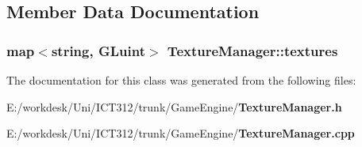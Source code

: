 \subsection{Member Data Documentation}
\subsubsection[{textures}]{\setlength{\rightskip}{0pt plus 5cm}map$<${\bf string}, {\bf G\+Luint}$>$ Texture\+Manager\+::textures\hspace{0.3cm}{\ttfamily [private]}}\label{class_texture_manager_ab74250155ea1d976c6e615e6084fbf02}


The documentation for this class was generated from the following files\+:\begin{DoxyCompactItemize}
\item 
E\+:/workdesk/\+Uni/\+I\+C\+T312/trunk/\+Game\+Engine/{\bf Texture\+Manager.\+h}\item 
E\+:/workdesk/\+Uni/\+I\+C\+T312/trunk/\+Game\+Engine/{\bf Texture\+Manager.\+cpp}\end{DoxyCompactItemize}
